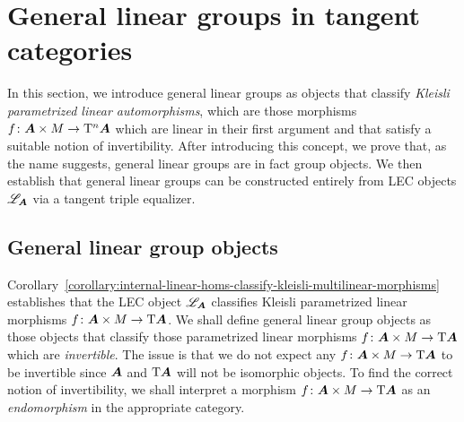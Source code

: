 \section{General linear groups in tangent categories}
\label{section:general-linear-groups}
In this section, we introduce general linear groups as objects that classify \emph{Kleisli parametrized linear automorphisms}, which are those morphisms $f\colon{\bm{A}}\times M\to\mathrm{T}^n{\bm{A}}$ which are linear in their first argument and that satisfy a suitable notion of invertibility. After introducing this concept, we prove that, as the name suggests, general linear groups are in fact group objects. We then establish that general linear groups can be constructed entirely from LEC objects $\mathscr{L}_{\bm{A}}$ via a tangent triple equalizer.



\subsection{General linear group objects}
\label{subsection:general-linear-groups}
Corollary~\ref{corollary:internal-linear-homs-classify-kleisli-multilinear-morphisms} establishes that the LEC object $\mathscr{L}_{\bm{A}}$ classifies Kleisli parametrized linear morphisms $f\colon{\bm{A}}\times M\to\mathrm{T}{\bm{A}}$. We shall define general linear group objects as those objects that classify those parametrized linear morphisms $f\colon{\bm{A}}\times M\to\mathrm{T}{\bm{A}}$ which are \emph{invertible}. The issue is that we do not expect any $f\colon{\bm{A}}\times M\to\mathrm{T}{\bm{A}}$ to be invertible since ${\bm{A}}$ and $\mathrm{T}{\bm{A}}$ will not be isomorphic objects. To find the correct notion of invertibility, we shall interpret a morphism $f\colon{\bm{A}}\times M\to\mathrm{T}{\bm{A}}$ as an \emph{endomorphism} in the appropriate category.

